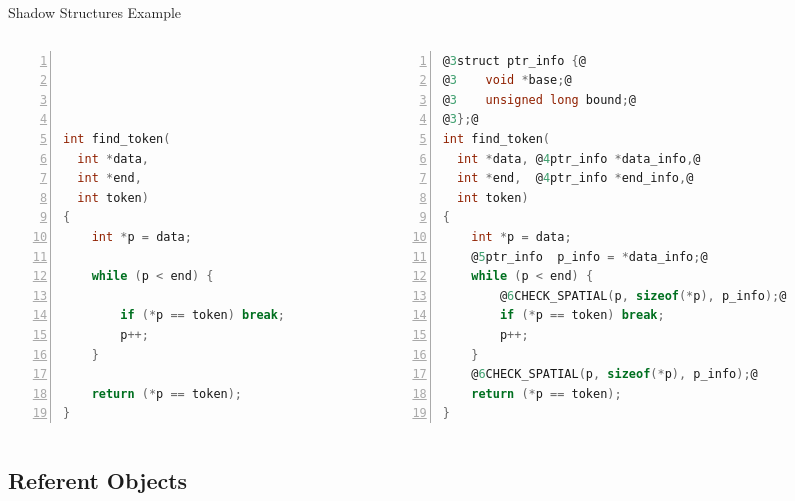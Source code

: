 \documentclass[aspectratio=169]{beamer}
\begin{document}
\begin{frame}[fragile]{Shadow Structures Example}
\begin{columns}
\begin{column}{0.42\textwidth}
\begin{lstlisting}[language=C,numbers=left,mathescape,basicstyle={\scriptsize\ttfamily}]




int find_token(
  int *data,
  int *end,
  int token)
{
    int *p = data;

    while (p < end) {

        if (*p == token) break;
        p++;
    }

    return (*p == token);
}
\end{lstlisting}
\end{column}

\pause

\begin{column}{0.56\textwidth}

\begin{lstlisting}[language=C,numbers=left,mathescape,basicstyle={\scriptsize\ttfamily},
    moredelim={**[is][{\btHL<3>}]{@3}{@}},
    moredelim={**[is][{\btHL<4>}]{@4}{@}},
    moredelim={**[is][{\btHL<5>}]{@5}{@}},
    moredelim={**[is][{\btHL<6>}]{@6}{@}},
]
@3struct ptr_info {@
@3    void *base;@
@3    unsigned long bound;@
@3};@
int find_token(
  int *data, @4ptr_info *data_info,@
  int *end,  @4ptr_info *end_info,@
  int token)
{
    int *p = data;
    @5ptr_info  p_info = *data_info;@
    while (p < end) {
        @6CHECK_SPATIAL(p, sizeof(*p), p_info);@
        if (*p == token) break;
        p++;
    }
    @6CHECK_SPATIAL(p, sizeof(*p), p_info);@
    return (*p == token);
}
\end{lstlisting}
    \end{column}
  \end{columns}
\end{frame}


\subsection{Referent Objects}
\end{document}
